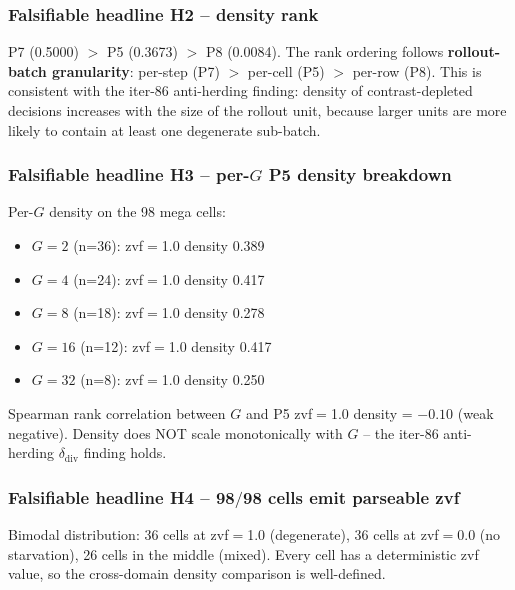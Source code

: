 \documentclass{article}
\begin{document}
\subsubsection{Falsifiable headline H2 -- density rank}
P7 (0.5000) $>$ P5 (0.3673) $>$ P8 (0.0084).  The rank ordering follows
\textbf{rollout-batch granularity}: per-step (P7) $>$ per-cell (P5)
$>$ per-row (P8).  This is consistent with the iter-86 anti-herding
finding: density of contrast-depleted decisions increases with the size
of the rollout unit, because larger units are more likely to contain at
least one degenerate sub-batch.

\subsubsection{Falsifiable headline H3 -- per-$G$ P5 density breakdown}
Per-$G$ density on the 98 mega cells:
\begin{itemize}
\item $G{=}2$  (n=36): zvf$=$1.0 density 0.389
\item $G{=}4$  (n=24): zvf$=$1.0 density 0.417
\item $G{=}8$  (n=18): zvf$=$1.0 density 0.278
\item $G{=}16$ (n=12): zvf$=$1.0 density 0.417
\item $G{=}32$ (n=8):  zvf$=$1.0 density 0.250
\end{itemize}
Spearman rank correlation between $G$ and P5 zvf$=$1.0 density = $-0.10$
(weak negative).  Density does NOT scale monotonically with $G$ -- the
iter-86 anti-herding $\delta_{\text{div}}$ finding holds.

\subsubsection{Falsifiable headline H4 -- 98$/$98 cells emit parseable zvf}
Bimodal distribution: 36 cells at zvf$=$1.0 (degenerate),
36 cells at zvf$=$0.0 (no starvation), 26 cells in the middle
(mixed).  Every cell has a deterministic zvf value, so the cross-domain
density comparison is well-defined.
\end{document}
